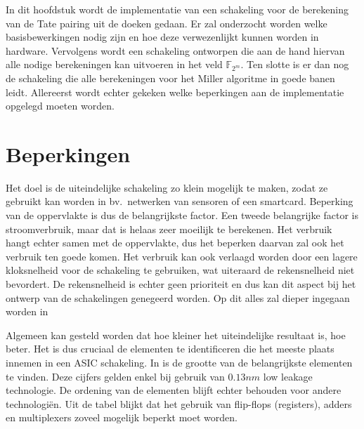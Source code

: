 \label{hfdst-implementatie}

In dit hoofdstuk wordt de implementatie van een schakeling voor de berekening van de Tate pairing uit de doeken gedaan. Er zal onderzocht worden welke basisbewerkingen nodig zijn en hoe deze verwezenlijkt kunnen worden in hardware. Vervolgens wordt een schakeling ontworpen die aan de hand hiervan alle nodige berekeningen kan uitvoeren in het veld $\mathbb{F}_{2^m}$. Ten slotte is er dan nog de schakeling die alle berekeningen voor het Miller algoritme in goede banen leidt. Allereerst wordt echter gekeken welke beperkingen aan de implementatie opgelegd moeten worden.

\section{Beperkingen}\label{sectie-implementatie-beperkingen}

Het doel is de uiteindelijke schakeling zo klein mogelijk te maken, zodat ze gebruikt kan worden in bv.\ netwerken van sensoren of een smartcard. Beperking van de oppervlakte is dus de belangrijkste factor. Een tweede belangrijke factor is stroomverbruik, maar dat is helaas zeer moeilijk te berekenen. Het verbruik hangt echter samen met de oppervlakte, dus het beperken daarvan zal ook het verbruik ten goede komen. Het verbruik kan ook verlaagd worden door een lagere kloksnelheid voor de schakeling te gebruiken, wat uiteraard de rekensnelheid niet bevordert. De rekensnelheid is echter geen prioriteit en dus kan dit aspect bij het ontwerp van de schakelingen genegeerd worden. Op dit alles zal dieper ingegaan worden in 

Algemeen kan gesteld worden dat hoe kleiner het uiteindelijke resultaat is, hoe beter. Het is dus cruciaal de elementen te identificeren die het meeste plaats innemen in een ASIC schakeling. In  is de grootte van de belangrijkste elementen te vinden. Deze cijfers gelden enkel bij gebruik van $0.13 nm$ low leakage technologie. De ordening van de elementen blijft echter behouden voor andere technologi\"en. Uit de tabel blijkt dat het gebruik van flip-flops (registers), adders en multiplexers zoveel mogelijk beperkt moet worden.

